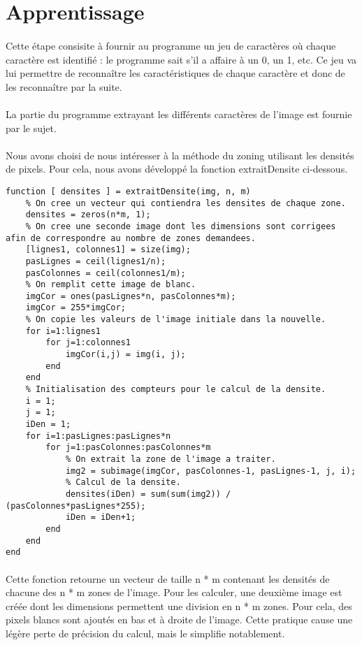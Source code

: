 \section{Apprentissage}

\paragraph{}
Cette étape consisite à fournir au programme un jeu de caractères où chaque caractère est identifié : le programme sait s'il a affaire à un 0, un 1, etc. 
Ce jeu va lui permettre de reconnaître les caractéristiques de chaque caractère et donc de les reconnaître par la suite. 

\paragraph{}
La partie du programme extrayant les différents caractères de l'image est fournie par le sujet. 

\paragraph{}
Nous avons choisi de nous intéresser à la méthode du zoning utilisant les densités de pixels. Pour cela, nous avons développé la fonction extraitDensite 
ci-dessous.
\\
\begin{lstlisting}
function [ densites ] = extraitDensite(img, n, m)
	% On cree un vecteur qui contiendra les densites de chaque zone.
	densites = zeros(n*m, 1);
	% On cree une seconde image dont les dimensions sont corrigees afin de correspondre au nombre de zones demandees.
	[lignes1, colonnes1] = size(img);
	pasLignes = ceil(lignes1/n);
	pasColonnes = ceil(colonnes1/m);
	% On remplit cette image de blanc.
	imgCor = ones(pasLignes*n, pasColonnes*m);
	imgCor = 255*imgCor;
	% On copie les valeurs de l'image initiale dans la nouvelle.
	for i=1:lignes1
		for j=1:colonnes1
			imgCor(i,j) = img(i, j);
		end
	end
	% Initialisation des compteurs pour le calcul de la densite.
	i = 1;
	j = 1;
	iDen = 1;
	for i=1:pasLignes:pasLignes*n
		for j=1:pasColonnes:pasColonnes*m
			% On extrait la zone de l'image a traiter.
			img2 = subimage(imgCor, pasColonnes-1, pasLignes-1, j, i);
			% Calcul de la densite.
			densites(iDen) = sum(sum(img2)) / (pasColonnes*pasLignes*255);
			iDen = iDen+1;
		end
	end
end
\end{lstlisting}

\paragraph{}
Cette fonction retourne un vecteur de taille n * m contenant les densités de chacune des n * m zones de l'image. Pour les calculer, une deuxième image 
est créée dont les dimensions permettent une division en n * m zones. Pour cela, des pixels blancs sont ajoutés en bas et à droite de l'image. Cette pratique 
cause une légère perte de précision du calcul, mais le simplifie notablement.
